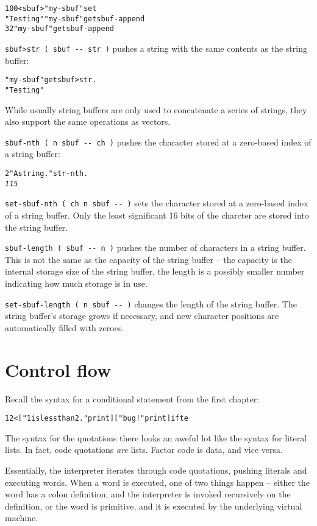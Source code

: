 \documentclass[english]{article}
\begin{document}
{\begin{alltt}
100 <sbuf> "my-sbuf" set
"Testing" "my-sbuf" get sbuf-append
32 "my-sbuf" get sbuf-append
\end{alltt}
\texttt{sbuf>str ( sbuf -{}- str )} pushes a string with the same
contents as the string buffer:

\begin{alltt}
"my-sbuf" get sbuf>str .
"Testing "
\end{alltt}
While usually string buffers are only used to concatenate a series
of strings, they also support the same operations as vectors.

\texttt{sbuf-nth ( n sbuf -{}- ch )} pushes the character stored at
a zero-based index of a string buffer:

\begin{alltt}
2 "A string." str-nth .
\emph{115}
\end{alltt}
\texttt{set-sbuf-nth ( ch n sbuf -{}- )} sets the character stored
at a zero-based index of a string buffer. Only the least significant
16 bits of the charcter are stored into the string buffer.

\texttt{sbuf-length ( sbuf -{}- n )} pushes the number of characters
in a string buffer. This is not the same as the capacity of the string
buffer -- the capacity is the internal storage size of the string
buffer, the length is a possibly smaller number indicating how much
storage is in use.

\texttt{set-sbuf-length ( n sbuf -{}- )} changes the length of the
string buffer. The string buffer's storage grows if necessary, and
new character positions are automatically filled with zeroes.

\section{Control flow}

Recall the syntax for a conditional statement from the first chapter:

\begin{alltt}
1 2 < {[} "1 is less than 2." print {]} {[} "bug!" print {]} ifte
\end{alltt}

The syntax for the quotations there looks an aweful lot like the syntax for literal lists. In fact, code quotations \emph{are} lists. Factor code is data, and vice versa.

Essentially, the interpreter iterates through code quotations, pushing literals and executing words. When a word is executed, one of two things happen -- either the word has a colon definition, and the interpreter is invoked recursively on the definition, or the word is primitive, and it is executed by the underlying virtual machine.

}
\end{document}
